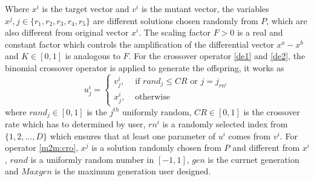\documentclass[journal]{IEEEtran}
\begin{document}
Where $x^i$ is the target vector and $v^i$ is the mutant vector, the variables $x^j, j \in \{r_1,r_2,r_3,r_4,r_5\}$ are different solutions chosen randomly from $P$, which are also different from original vector $x^i$. The scaling factor $F > 0$ is a real and constant factor which controls the amplification of the differential vector $x^a-x^b$ and $K \in [0,1]$ is analogous to $F$. For the crossover operator \ref{de1} and \ref{de2}, the binomial crossover operator \cite{storn1997differential} is applied to generate the offspring, it works as
\begin{equation}
  u_{j}^{i}=\left\{\begin{array}{ll}
    v_{j}^{i}, & \text { if }  { rand_j } \leq C R \text { or } j=j_{ {rn^i }} \\
    x_{j}^{i}, & \text { otherwise }
  \end{array}\right.
\end{equation}
where $rand_j \in [0,1]$ is the $j^{th}$ uniformly random, $CR \in [0,1]$ is the crossover rate which has to determined by user, $rn^i$ is a randomly selected index from $\{1,2,\dots,D\}$ which ensures that at least one parameter of $u^i$ comes from $v^i$.
For operator \ref{m2m:cro}, $x^j$ is a solution randomly chosen from $P$ and different from $x^i$, $rand$ is a uniformly random number in $[-1,1]$, $gen$ is the currnet generation and $Maxgen$ is the maximum generation user designed.
\end{document}
